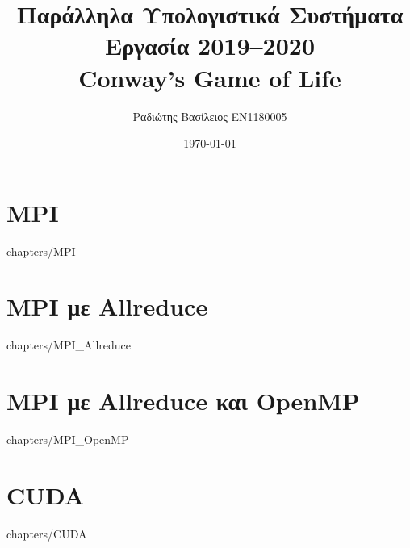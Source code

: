 \documentclass[a4paper,twoside,12pt]{report}
\title {Παράλληλα Υπολογιστικά Συστήματα\\Εργασία 2019--2020\\Conway’s Game of Life}
\author {Ραδιώτης Βασίλειος EN1180005}
\date {\today}
\begin{document}
\maketitle

\tableofcontents{}

\chapter {MPI}
     {chapters/MPI}

\chapter {MPI με Allreduce}
     {chapters/MPI_Allreduce}

\chapter {MPI με Allreduce και OpenMP}
     {chapters/MPI_OpenMP}

\chapter {CUDA}
     {chapters/CUDA}
\end{document}

